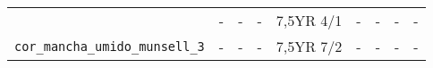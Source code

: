 \documentclass[
]{book}
\begin{document}
\begin{longtable}[]{@{}lllllllll@{}}
\begin{minipage}[t]{0.22\columnwidth}
\end{minipage} & \begin{minipage}[t]{0.06\columnwidth}\raggedright
-\strut
\end{minipage} & \begin{minipage}[t]{0.06\columnwidth}\raggedright
-\strut
\end{minipage} & \begin{minipage}[t]{0.07\columnwidth}\raggedright
-\strut
\end{minipage} & \begin{minipage}[t]{0.07\columnwidth}\raggedright
7,5YR 4/1\strut
\end{minipage} & \begin{minipage}[t]{0.07\columnwidth}\raggedright
-\strut
\end{minipage} & \begin{minipage}[t]{0.07\columnwidth}\raggedright
-\strut
\end{minipage} & \begin{minipage}[t]{0.07\columnwidth}\raggedright
-\strut
\end{minipage} & \begin{minipage}[t]{0.06\columnwidth}\raggedright
-\strut
\end{minipage}\tabularnewline
\begin{minipage}[t]{0.22\columnwidth}\raggedright
\texttt{cor\_mancha\_umido\_munsell\_3}\strut
\end{minipage} & \begin{minipage}[t]{0.06\columnwidth}\raggedright
-\strut
\end{minipage} & \begin{minipage}[t]{0.06\columnwidth}\raggedright
-\strut
\end{minipage} & \begin{minipage}[t]{0.07\columnwidth}\raggedright
-\strut
\end{minipage} & \begin{minipage}[t]{0.07\columnwidth}\raggedright
7,5YR 7/2\strut
\end{minipage} & \begin{minipage}[t]{0.07\columnwidth}\raggedright
-\strut
\end{minipage} & \begin{minipage}[t]{0.07\columnwidth}\raggedright
-\strut
\end{minipage} & \begin{minipage}[t]{0.07\columnwidth}\raggedright
-\strut
\end{minipage} & \begin{minipage}[t]{0.06\columnwidth}\raggedright
-\strut
\end{minipage}\tabularnewline
\bottomrule
\end{longtable}
\end{document}
